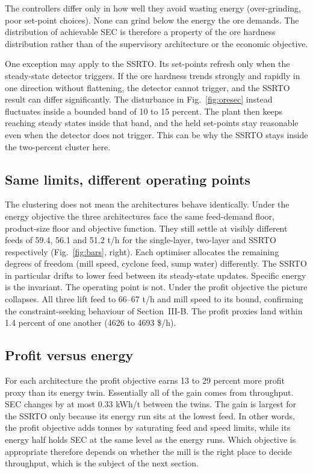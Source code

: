 \documentclass[conference]{IEEEtran}
\begin{document}
The controllers differ only in how well they avoid wasting energy
(over-grinding, poor set-point choices). None can grind below the energy
the ore demands. The distribution of achievable SEC is therefore a
property of the ore hardness distribution rather than of the supervisory
architecture or the economic objective.

One exception may apply to the SSRTO. Its set-points refresh only when
the steady-state detector triggers. If the ore hardness trends strongly
and rapidly in one direction without flattening, the detector cannot
trigger, and the SSRTO result can differ significantly. The disturbance
in Fig.~\ref{fig:oresec} instead fluctuates inside a bounded band of 10
to 15 percent.
The plant then keeps reaching steady states inside that band, and the
held set-points stay reasonable even when the detector does not
trigger. This can be why the SSRTO stays inside the two-percent cluster
here.

\subsection{Same limits, different operating points}

The clustering does not mean the architectures behave identically. Under
the energy objective the three architectures face the same feed-demand
floor, product-size floor and objective function. They still settle at
visibly different feeds of 59.4, 56.1 and 51.2 t/h for the single-layer,
two-layer and SSRTO respectively (Fig.~\ref{fig:bars}, right). Each
optimiser allocates the remaining degrees of freedom (mill speed, cyclone
feed, sump water) differently. The SSRTO in particular drifts to
lower feed between its steady-state updates. Specific energy is the
invariant. The operating point is not. Under the profit objective the
picture collapses. All three lift feed to 66--67 t/h and mill speed to
its bound, confirming the constraint-seeking behaviour of Section~III-B.
The profit proxies land within 1.4 percent of one another (4626 to 4693
\$/h).

\subsection{Profit versus energy}

For each architecture the profit objective earns 13 to 29 percent more
profit proxy than its energy twin. Essentially all of the gain comes from
throughput. SEC changes by at most 0.33 kWh/t between the twins. The gain is largest
for the SSRTO only because its energy run sits at the lowest feed. In
other words, the profit objective adds tonnes by saturating feed and
speed limits, while its energy half holds SEC at the same level as the
energy runs. Which objective is appropriate therefore depends on whether
the mill is the right place to decide throughput, which is the subject
of the next section.
\end{document}
